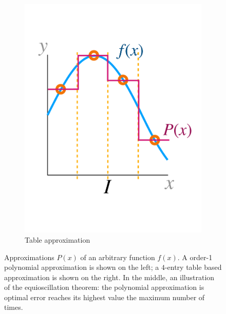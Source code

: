 \documentclass[paper.tex]{subfiles}
\begin{document}
\begin{figure}
\begin{subfigure}{0.315\textwidth}
\includegraphics[width=\textwidth]{images/table.pdf}
\caption{Table approximation}
\label{fig:table-approx}
\end{subfigure}
\caption{
Approximations $P(x)$ of an arbitrary function $f(x)$.
A order-1 polynomial approximation is shown on the left;
  a $4$-entry table based approximation is shown on the right.
In the middle, an illustration of the equioscillation theorem:
  the polynomial approximation is optimal
  error reaches its highest value the maximum
  number of times.
}
\label{fig:approx}
\end{figure}
\end{document}
